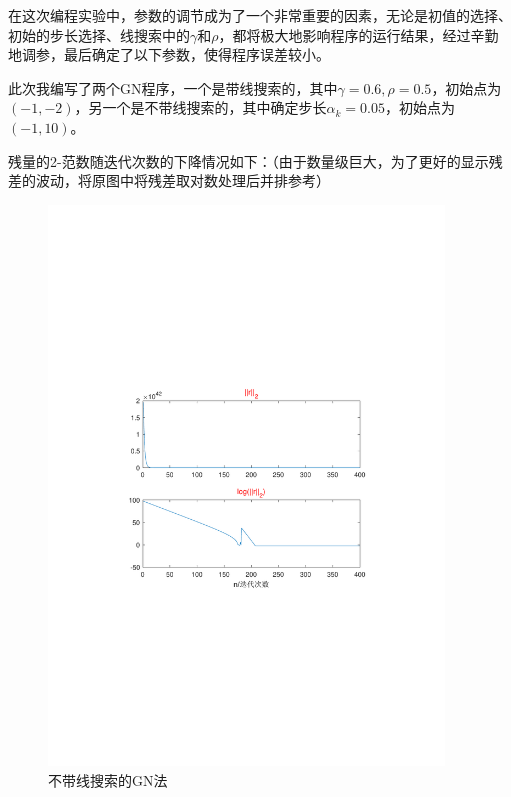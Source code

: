在这次编程实验中，参数的调节成为了一个非常重要的因素，无论是初值的选择、初始的步长选择、线搜索中的$\gamma$和$\rho$，都将极大地影响程序的运行结果，经过辛勤地调参，最后确定了以下参数，使得程序误差较小。

此次我编写了两个GN程序，一个是带线搜索的，其中$\gamma=0.6,\rho=0.5$，初始点为$(-1,-2)$，另一个是不带线搜索的，其中确定步长$\alpha_k=0.05$，初始点为$(-1,10)$。

残量的2-范数随迭代次数的下降情况如下：（由于数量级巨大，为了更好的显示残差的波动，将原图中将残差取对数处理后并排参考）

\begin{figure}[H]
\centering
\includegraphics[width=10.5cm]{fig/6_3.pdf}
\caption{不带线搜索的GN法}
\end{figure}

